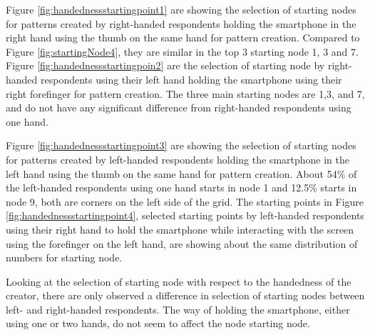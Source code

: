   Figure \ref{fig:handednessstartingpoint1} are showing the selection of starting nodes for patterns created by right-handed respondents holding the smartphone in the right hand using the thumb on the same hand for pattern creation. Compared to Figure \ref{fig:startingNode4}, they are similar in the top 3 starting node 1, 3 and 7. Figure \ref{fig:handednessstartingpoin2} are the selection of starting node by right-handed respondents using their left hand holding the smartphone using their right forefinger for pattern creation. The three main starting nodes are 1,3, and 7, and do not have any significant difference from right-handed respondents using one hand. 

  Figure \ref{fig:handednessstartingpoint3} are showing the selection of starting nodes for patterns created by left-handed respondents holding the smartphone in the left hand using the thumb on the same hand for pattern creation. About 54\% of the left-handed respondents using one hand starts in node 1 and 12.5\% starts in node 9, both are corners on the left side of the grid. The starting points in Figure \ref{fig:handednessstartingpoint4}, selected starting points by left-handed respondents using their right hand to hold the smartphone while interacting with the screen using the forefinger on the left hand, are showing about the same distribution of numbers for starting node.

  Looking at the selection of starting node with respect to the handedness of the creator, there are only observed a difference in selection of starting nodes between left- and right-handed respondents. The way of holding the smartphone, either using one or two hands, do not seem to affect the node starting node. 

  \clearpage

